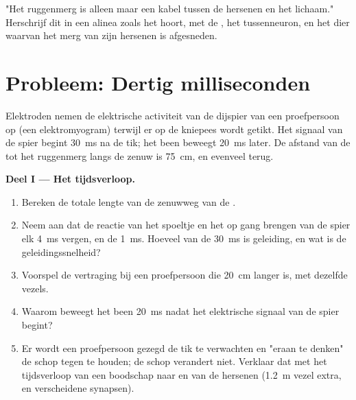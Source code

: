 \begin{exercise}[$\star\star\star$]\label{exo:g12:stretch-reflex:15}
"Het ruggenmerg is alleen maar een kabel tussen de hersenen en het
lichaam." Herschrijf dit in een alinea zoals het hoort, met de , het
tussenneuron, en het dier waarvan het merg van zijn hersenen is
afgesneden.
\end{exercise}

\section{Probleem: Dertig milliseconden}

\begin{problem}
\label{pb:g12:stretch-reflex:1}
Elektroden nemen de elektrische activiteit van de dijspier van een
proefpersoon op (een elektromyogram) terwijl er op de kniepees wordt
getikt. Het signaal van de spier begint \qty{30}{ms} na de tik; het been
beweegt \qty{20}{ms} later. De afstand van de  tot het ruggenmerg
langs de zenuw is \qty{75}{cm}, en evenveel terug.

\medskip
\noindent\textbf{Deel I --- Het tijdsverloop.}
\begin{enumerate}
  \item Bereken de totale lengte van de zenuwweg van de .
  \item Neem aan dat de reactie van het spoeltje en het op gang brengen
        van de spier elk \qty{4}{ms} vergen, en de  \qty{1}{ms}.
        Hoeveel van de \qty{30}{ms} is geleiding, en wat is de
        geleidingssnelheid?
  \item Voorspel de vertraging bij een proefpersoon die \qty{20}{cm} langer
        is, met dezelfde vezels.
  \item Waarom beweegt het been \qty{20}{ms} nadat het elektrische signaal
        van de spier begint?
  \item Er wordt een proefpersoon gezegd de tik te verwachten en "eraan te
        denken" de schop tegen te houden; de schop verandert niet. Verklaar
        dat met het tijdsverloop van een boodschap naar en van de hersenen
        (\qty{1.2}{m} vezel extra, en verscheidene synapsen).
\end{enumerate}


\end{problem}
